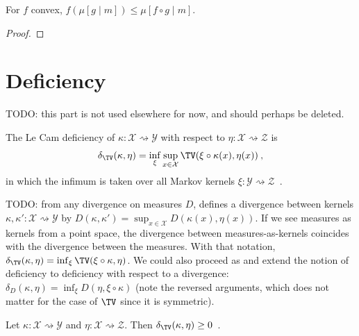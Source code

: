 \begin{theorem}
  \label{thm:condexp_jensen}
  \mathlibok
  For $f$ convex, $f\left(\mu [g \mid m]\right) \le \mu [f \circ g \mid m]$.
\end{theorem}

\begin{proof}\mathlibok
\end{proof}

\chapter{Deficiency}

TODO: this part is not used elsewhere for now, and should perhaps be deleted.

\begin{definition}
  \label{def:deficiency}
  The Le Cam deficiency of $\kappa : \mathcal X \rightsquigarrow \mathcal Y$ with respect to $\eta : \mathcal X \rightsquigarrow \mathcal Z$ is
  \begin{align*}
  \delta_{\TV}(\kappa, \eta) = \inf_{\xi} \sup_{x \in \mathcal X} \TV(\xi \circ \kappa (x), \eta(x)) \: ,
  \end{align*}
  in which the infimum is taken over all Markov kernels $\xi : \mathcal Y \rightsquigarrow \mathcal Z$~.
\end{definition}

TODO: from any divergence on measures $D$, \cite{perrone2023markov} defines a divergence between kernels $\kappa, \kappa' : \mathcal X \rightsquigarrow \mathcal Y$ by $D(\kappa, \kappa') = \sup_{x \in \mathcal X} D(\kappa(x), \eta(x))$.
If we see measures as kernels from a point space, the divergence between measures-as-kernels coincides with the divergence between the measures.
With that notation, $\delta_{\TV}(\kappa, \eta) = \inf_{\xi} \TV(\xi \circ \kappa, \eta)$.
We could also proceed as \cite{raginsky2011shannon} and extend the notion of deficiency to deficiency with respect to a divergence: $\delta_D(\kappa, \eta) = \inf_{\xi} D(\eta, \xi\circ\kappa)$ (note the reversed arguments, which does not matter for the case of $\TV$ since it is symmetric).

\begin{lemma}
  \label{lem:deficiency_nonneg}
  Let $\kappa: \mathcal X \rightsquigarrow \mathcal Y$ and $\eta : \mathcal X \rightsquigarrow \mathcal Z$. Then $\delta_{\TV}(\kappa, \eta) \ge 0$~.
\end{lemma}

